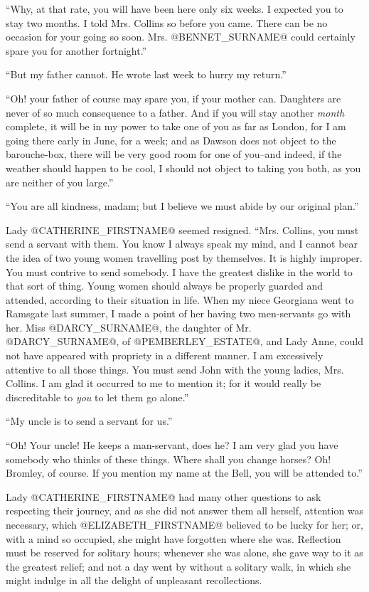 ``Why, at that rate, you will have been here only six weeks. I expected
you to stay two months. I told Mrs. Collins so before you came. There
can be no occasion for your going so soon. Mrs. @BENNET_SURNAME@ could certainly
spare you for another fortnight.''

``But my father cannot. He wrote last week to hurry my return.''

``Oh! your father of course may spare you, if your mother can. Daughters
are never of so much consequence to a father. And if you will stay
another \textit{month} complete, it will be in my power to take one of you as
far as London, for I am going there early in June, for a week; and as
Dawson does not object to the barouche-box, there will be very good room
for one of you--and indeed, if the weather should happen to be cool, I
should not object to taking you both, as you are neither of you large.''

``You are all kindness, madam; but I believe we must abide by our
original plan.''

Lady @CATHERINE_FIRSTNAME@ seemed resigned. ``Mrs. Collins, you must send a servant
with them. You know I always speak my mind, and I cannot bear the idea
of two young women travelling post by themselves. It is highly improper.
You must contrive to send somebody. I have the greatest dislike in
the world to that sort of thing. Young women should always be properly
guarded and attended, according to their situation in life. When my
niece Georgiana went to Ramsgate last summer, I made a point of her
having two men-servants go with her. Miss @DARCY_SURNAME@, the daughter of
Mr. @DARCY_SURNAME@, of @PEMBERLEY_ESTATE@, and Lady Anne, could not have appeared with
propriety in a different manner. I am excessively attentive to all those
things. You must send John with the young ladies, Mrs. Collins. I
am glad it occurred to me to mention it; for it would really be
discreditable to \textit{you} to let them go alone.''

``My uncle is to send a servant for us.''

``Oh! Your uncle! He keeps a man-servant, does he? I am very glad you
have somebody who thinks of these things. Where shall you change horses?
Oh! Bromley, of course. If you mention my name at the Bell, you will be
attended to.''

Lady @CATHERINE_FIRSTNAME@ had many other questions to ask respecting their journey,
and as she did not answer them all herself, attention was necessary,
which @ELIZABETH_FIRSTNAME@ believed to be lucky for her; or, with a mind so
occupied, she might have forgotten where she was. Reflection must be
reserved for solitary hours; whenever she was alone, she gave way to it
as the greatest relief; and not a day went by without a solitary
walk, in which she might indulge in all the delight of unpleasant
recollections.

